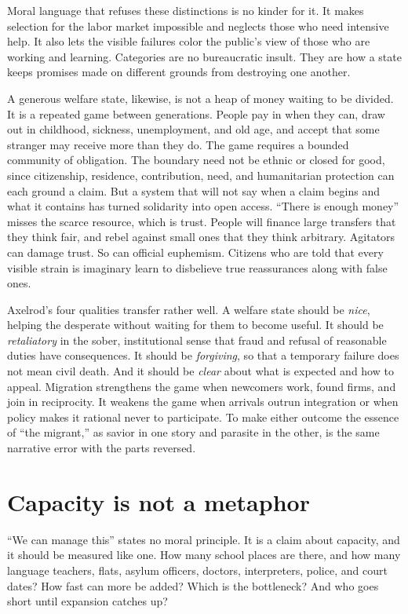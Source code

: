 \documentclass[12pt,a4paper]{book}
\begin{document}
Moral language that refuses these distinctions is no kinder for it. It makes selection for the labor market impossible and neglects those who need intensive help. It also lets the visible failures color the public's view of those who are working and learning. Categories are no bureaucratic insult. They are how a state keeps promises made on different grounds from destroying one another.

A generous welfare state, likewise, is not a heap of money waiting to be divided. It is a repeated game between generations. People pay in when they can, draw out in childhood, sickness, unemployment, and old age, and accept that some stranger may receive more than they do. The game requires a bounded community of obligation. The boundary need not be ethnic or closed for good, since citizenship, residence, contribution, need, and humanitarian protection can each ground a claim. But a system that will not say when a claim begins and what it contains has turned solidarity into open access. ``There is enough money'' misses the scarce resource, which is trust. People will finance large transfers that they think fair, and rebel against small ones that they think arbitrary. Agitators can damage trust. So can official euphemism. Citizens who are told that every visible strain is imaginary learn to disbelieve true reassurances along with false ones.

Axelrod's four qualities transfer rather well. A welfare state should be \emph{nice}, helping the desperate without waiting for them to become useful. It should be \emph{retaliatory} in the sober, institutional sense that fraud and refusal of reasonable duties have consequences. It should be \emph{forgiving}, so that a temporary failure does not mean civil death. And it should be \emph{clear} about what is expected and how to appeal. Migration strengthens the game when newcomers work, found firms, and join in reciprocity. It weakens the game when arrivals outrun integration or when policy makes it rational never to participate. To make either outcome the essence of ``the migrant,'' as savior in one story and parasite in the other, is the same narrative error with the parts reversed.

\section{Capacity is not a metaphor}

``We can manage this'' states no moral principle. It is a claim about capacity, and it should be measured like one. How many school places are there, and how many language teachers, flats, asylum officers, doctors, interpreters, police, and court dates? How fast can more be added? Which is the bottleneck? And who goes short until expansion catches up?
\end{document}

